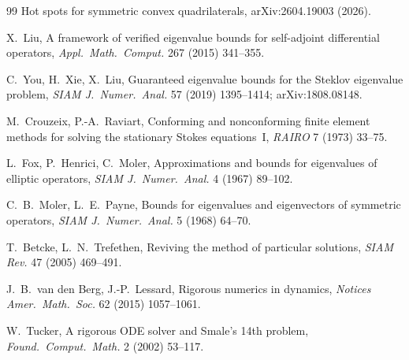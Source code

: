 \documentclass[11pt]{article}
\begin{document}
\begin{thebibliography}{99}
 Hot spots for symmetric convex quadrilaterals,
arXiv:2604.19003 (2026).

 X.~Liu, A framework of verified eigenvalue bounds
for self-adjoint differential operators, \emph{Appl.\ Math.\ Comput.}
267 (2015) 341--355.

 C.~You, H.~Xie, X.~Liu, Guaranteed eigenvalue
bounds for the Steklov eigenvalue problem, \emph{SIAM J.\ Numer.\
Anal.} 57 (2019) 1395--1414; arXiv:1808.08148.

 M.~Crouzeix, P.-A.~Raviart, Conforming and
nonconforming finite element methods for solving the stationary Stokes
equations~I, \emph{RAIRO} 7 (1973) 33--75.

 L.~Fox, P.~Henrici, C.~Moler, Approximations and bounds
for eigenvalues of elliptic operators, \emph{SIAM J.\ Numer.\ Anal.} 4
(1967) 89--102.

 C.~B.~Moler, L.~E.~Payne, Bounds for eigenvalues
and eigenvectors of symmetric operators, \emph{SIAM J.\ Numer.\ Anal.}
5 (1968) 64--70.

 T.~Betcke, L.~N.~Trefethen, Reviving the
method of particular solutions, \emph{SIAM Rev.} 47 (2005) 469--491.

 J.~B.~van den Berg, J.-P.~Lessard, Rigorous numerics in
dynamics, \emph{Notices Amer.\ Math.\ Soc.} 62 (2015) 1057--1061.

 W.~Tucker, A rigorous ODE solver and Smale's 14th
problem, \emph{Found.\ Comput.\ Math.} 2 (2002) 53--117.

\end{thebibliography}
\end{document}
